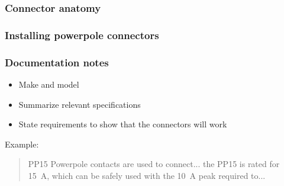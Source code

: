 \documentclass[aspectratio=169]{beamer}
\begin{document}
\begin{frame}
\frametitle{Connector anatomy}
\end{frame}

\begin{frame}
\frametitle{Installing powerpole connectors}
\end{frame}

\begin{frame}
\frametitle{Documentation notes}
\begin{itemize}
\item Make and model
\item Summarize relevant specifications
\item State requirements to show that the connectors will work
\end{itemize}

Example:
\begin{quotation}
PP15 Powerpole contacts are used to connect... the PP15 is rated for \SI{15}{\ampere}, which can be safely used with the \SI{10}{\ampere} peak required to...
\end{quotation}
\end{frame}
\end{document}
